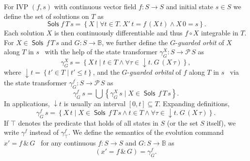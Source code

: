 \documentclass[envcountsame,envcountsect]{llncs}
\newcommand{\Pow}{\mathcal{P}}
\newcommand{\bools}{\mathbb{B}}
\newcommand{\Sols}{\mathop{\mathsf{Sols}}}
\newcommand\notein[3]{\todo[inline,linecolor=orange!80!black,backgroundcolor=#2!20]{#1: #3}%
}
\newcommand{\gin}[1]{\notein{{\bf GS}}{gcolor}{#1}}
\begin{document}
For IVP $(f,s)$ with continuous vector field $f:S\to S$ and initial
state $s\in S$ we define the set of solutions on
$T$ as
\begin{equation*}
\Sols f\, T\, s = \left\{X \mid \forall t\in T.\  X'\, t = f\, (X\, t)\land X\, 0 = s\right\}.
\end{equation*}
Each solution $X$ is then continuously differentiable and thus
$f\circ X$ integrable in $T$.  For $X\in \Sols\, f\, T\, s$ and
$G:S\to\bools$, we further define the $G$-\emph{guarded orbit} of $X$
along $T$ in $s$~\cite{MuniveS19} with the help of the state transformer
$\gamma^X_G:S\to \Pow\, S$ as 
\begin{equation*}
\gamma^X_{G}\, s= \left\{X\, t\mid t\in T\land \forall \tau\in
{\downarrow}t.\ G\, (X\, \tau)\right\},
\end{equation*}
where ${\downarrow}t = \left\{t'\in T\mid t'\le t\right\}$, and the
$G$-\emph{guarded orbital} of $f$ along $T$ in $s$~\cite{MuniveS19}
via the state transformer $\gamma^f_G:S\to \Pow\, S$ as
\begin{equation*}
  \gamma^f_G\ s = \bigcup\left\{\gamma^X_G\, s\mid X\in \Sols\, f\, T\, s\right\}.
\end{equation*}
In applications, ${\downarrow}t$ is usually an interval
$[0,t]\subseteq T$.  Expanding definitions,
\begin{equation*}
\gamma^f_G\, s = \left\{X\, t \mid X\in \Sols\, f\, T\, s \land t\in T
\land \forall \tau\in{\downarrow}t.\ G\, (X\, \tau)\right\}.
\end{equation*}
If $\top$ denotes the predicate that holds of all states in $S$ (or
the set $S$ itself), we write $\gamma^f$ instead of
$\gamma^f_\top$. We define the semantics of the evolution command
$x'= f\, \&\, G$~\cite{MuniveS19} for any continuous $f:S\to S$ and
$G:S\to \bools$ as
\begin{equation}
{\left(x'= f\, \&\, G\right)} = \gamma^f_G.\label{eq:st-evl}\tag{st-evl}
\end{equation}

\end{document}
